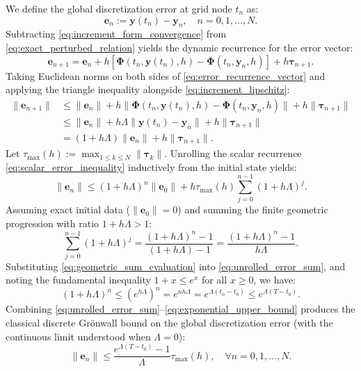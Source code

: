 We define the global discretization error at grid node $t_n$ as:
\begin{equation}
\label{eq:global_error_def}
\mathbf{e}_n := \mathbf{y}(t_n) - \mathbf{y}_n, \quad n = 0, 1, \dots, N.
\end{equation}
Subtracting \eqref{eq:increment_form_convergence} from \eqref{eq:exact_perturbed_relation} yields the dynamic recurrence for the error vector:
\begin{equation}
\label{eq:error_recurrence_vector}
\mathbf{e}_{n+1} = \mathbf{e}_n + h \left[ \mathbf{\Phi}(t_n, \mathbf{y}(t_n), h) - \mathbf{\Phi}(t_n, \mathbf{y}_n, h) \right] + h \boldsymbol{\tau}_{n+1}.
\end{equation}
Taking Euclidean norms on both sides of \eqref{eq:error_recurrence_vector} and applying the triangle inequality alongside \eqref{eq:increment_lipschitz}:
\begin{align}
\|\mathbf{e}_{n+1}\| &\le \|\mathbf{e}_n\| + h \|\mathbf{\Phi}(t_n, \mathbf{y}(t_n), h) - \mathbf{\Phi}(t_n, \mathbf{y}_n, h)\| + h \|\boldsymbol{\tau}_{n+1}\| \nonumber \\
&\le \|\mathbf{e}_n\| + h \Lambda \|\mathbf{y}(t_n) - \mathbf{y}_n\| + h \|\boldsymbol{\tau}_{n+1}\| \nonumber \\
&= (1 + h \Lambda) \|\mathbf{e}_n\| + h \|\boldsymbol{\tau}_{n+1}\|. \label{eq:scalar_error_inequality}
\end{align}
Let $\tau_{\max}(h) := \max_{1 \le k \le N} \|\boldsymbol{\tau}_k\|$. Unrolling the scalar recurrence \eqref{eq:scalar_error_inequality} inductively from the initial state yields:
\begin{equation}
\label{eq:unrolled_error_sum}
\|\mathbf{e}_n\| \le (1 + h\Lambda)^n \|\mathbf{e}_0\| + h \tau_{\max}(h) \sum_{j=0}^{n-1} (1 + h\Lambda)^j.
\end{equation}
Assuming exact initial data ($\|\mathbf{e}_0\| = 0$) and summing the finite geometric progression with ratio $1 + h\Lambda > 1$:
\begin{equation}
\label{eq:geometric_sum_evaluation}
\sum_{j=0}^{n-1} (1 + h\Lambda)^j = \frac{(1 + h\Lambda)^n - 1}{(1 + h\Lambda) - 1} = \frac{(1 + h\Lambda)^n - 1}{h\Lambda}.
\end{equation}
Substituting \eqref{eq:geometric_sum_evaluation} into \eqref{eq:unrolled_error_sum}, and noting the fundamental inequality $1 + x \le e^x$ for all $x \ge 0$, we have:
\begin{equation}
\label{eq:exponential_upper_bound}
(1 + h\Lambda)^n \le \left(e^{h\Lambda}\right)^n = e^{n h \Lambda} = e^{\Lambda (t_n - t_0)} \le e^{\Lambda(T - t_0)}.
\end{equation}
Combining \eqref{eq:unrolled_error_sum}--\eqref{eq:exponential_upper_bound} produces the classical discrete Gr\"onwall bound on the global discretization error (with the continuous limit understood when $\Lambda=0$):
\begin{equation}
\label{eq:global_convergence_bound}
\|\mathbf{e}_n\| \le \frac{e^{\Lambda(T - t_0)} - 1}{\Lambda} \tau_{\max}(h), \quad \forall n = 0, 1, \dots, N.
\end{equation}


